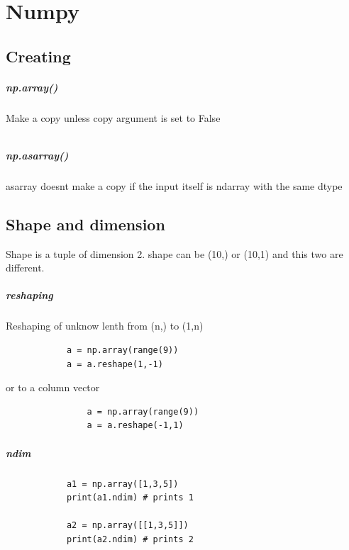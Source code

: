 \chapter{Numpy}
\section{Creating}
    \paragraph{np.array()}
        Make a copy unless copy argument is set to False
        \begin{verbatim}
        \end{verbatim}
    \paragraph{np.asarray()}
        asarray doesnt make a copy if the input itself is ndarray with the same dtype
\section{Shape and dimension}
    Shape is a tuple of dimension 2. shape can be (10,) or (10,1) and this two are different.
    \paragraph{reshaping}
        Reshaping of unknow lenth from (n,) to (1,n)
        \begin{verbatim}
            a = np.array(range(9))
            a = a.reshape(1,-1)
        \end{verbatim}
        or to a column vector
        \begin{verbatim}
                a = np.array(range(9))
                a = a.reshape(-1,1)
        \end{verbatim}
    \paragraph{ndim}
        \begin{verbatim}
            a1 = np.array([1,3,5])
            print(a1.ndim) # prints 1
            
            a2 = np.array([[1,3,5]])
            print(a2.ndim) # prints 2
        \end{verbatim}
